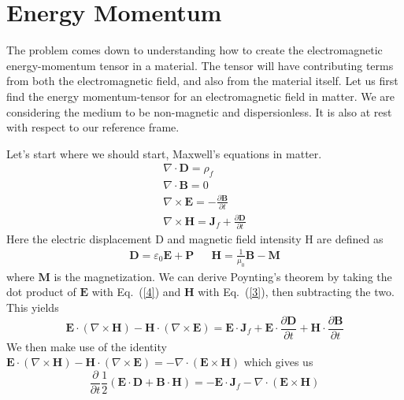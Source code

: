 \documentclass[twocolumn,english,pra,aps,superscriptaddress,floatfix]{revtex4-1}
\begin{document}
\section{Energy Momentum}
\label{sec:EnergyMomentum}

The problem comes down to understanding how to create the electromagnetic energy-momentum tensor in a material.  The tensor will have contributing terms from both the electromagnetic field, and also from the material itself. Let us first find the energy momentum-tensor for an electromagnetic field in matter.  We are considering the medium to be non-magnetic and dispersionless.  It is also at rest with respect to our reference frame. 

Let's start where we should start, Maxwell's equations in matter.
\begin{align}
&\nabla\cdot\mathbf{D}=\rho_f& \label{1}\\
&\nabla\cdot\mathbf{B}=0& \label{2}\\ 
&\nabla\times\mathbf{E}= -\frac{\partial\mathbf{B}}{\partial t}& \label{3}\\
&\nabla\times\mathbf{H}=\mathbf{J}_f+\frac{\partial\mathbf{D}}{\partial t}&\label{4}
\end{align}
Here the electric displacement $\mathrm{D}$ and magnetic field intensity $\mathrm{H}$ are defined as
\begin{align}
&\mathbf{D}=\varepsilon_0\mathbf{E}+\mathbf{P}& 
&\mathbf{H}=\frac{1}{\mu_0}\mathbf{B}-\mathbf{M}& 
\end{align}
where $\mathbf{M}$ is the magnetization.  We can derive Poynting's theorem by taking the dot product of $\mathbf{E}$ with Eq.\ (\ref{4}) and $\mathbf{H}$ with Eq.\ (\ref{3}), then subtracting the two.  This yields
\begin{equation}
\mathbf{E}\cdot\left(\nabla\times\mathbf{H}\right) -\mathbf{H}\cdot\left(\nabla\times\mathbf{E}\right)=\mathbf{E}\cdot\mathbf{J}_f+\mathbf{E}\cdot\frac{\partial\mathbf{D}}{\partial t} +\mathbf{H}\cdot\frac{\partial\mathbf{B}}{\partial t}
\end{equation}
We then make use of the identity $\mathbf{E}\cdot\left(\nabla\times\mathbf{H}\right) -\mathbf{H}\cdot\left(\nabla\times\mathbf{E}\right)= -\nabla\cdot\left(\mathbf{E}\times\mathbf{H}\right)$ which gives us
\begin{equation}
\frac{\partial}{\partial t}\frac{1}{2}\left(\mathbf{E}\cdot\mathbf{D} + \mathbf{B}\cdot\mathbf{H}\right) =-\mathbf{E}\cdot\mathbf{J}_f-\nabla\cdot\left(\mathbf{E}\times\mathbf{H}\right)
\label{poyntingthm}
\end{equation}
\end{document}
